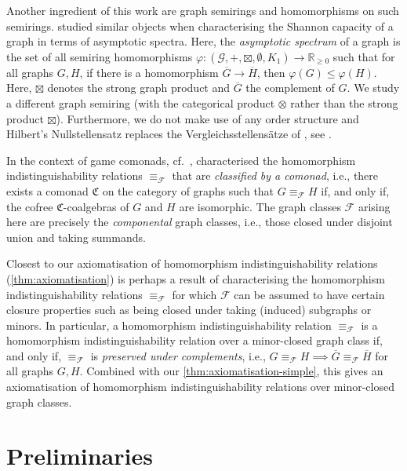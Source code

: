 \documentclass[11pt]{scrartcl}
\theoremstyle{definition}
\theoremstyle{plain}
\theoremstyle{remark}
\renewcommand\phi\varphi
\begin{document}
	Another ingredient of this work are graph semirings and homomorphisms on such semirings.
	\textcite{zuiddam_asymptotic_2019} studied similar objects when characterising the Shannon capacity of a graph in terms of asymptotic spectra.
	Here, the \emph{asymptotic spectrum} of a graph is the set of all semiring homomorphisms $\phi \colon (\mathcal{G}, +, \boxtimes, \emptyset, K_1) \to \mathbb{R}_{\geq 0}$ such that for all graphs $G, H$, if there is a homomorphism $\overline{G} \to \overline{H}$, then $\phi(G) \leq \phi(H)$.
	Here, $\boxtimes$ denotes the strong graph product and $\overline{G}$ the complement of $G$.
	We study a different graph semiring (with the categorical product $\otimes$ rather than the strong product $\boxtimes$). 
	Furthermore, we do not make use of any order structure and Hilbert's Nullstellensatz replaces the Vergleichsstellens\"atze of \textcite{strassen_asymptotic_1988}, see \cite{fritz_unified_2021}.

	In the context of game comonads, cf.\ \cite{dawar_lovasz-type_2021}, \textcite{abramsky_discrete_2022} characterised the homomorphism indistinguishability relations $\equiv_{\mathcal{F}}$ that are \emph{classified by a comonad}, i.e., there exists a comonad $\mathfrak{C}$ on the category of graphs such that $G \equiv_{\mathcal{F}} H$ if, and only if, the cofree $\mathfrak{C}$-coalgebras of $G$ and $H$ are isomorphic.
	The graph classes $\mathcal{F}$ arising here are precisely the \emph{componental} graph classes, i.e., those closed under disjoint union and taking summands. 

	Closest to our axiomatisation of homomorphism indistinguishability relations (\cref{thm:axiomatisation}) is perhaps a result of \textcite{seppelt_logical_2024} characterising the homomorphism indistinguishability relations $\equiv_{\mathcal{F}}$ for which $\mathcal{F}$ can be assumed to have certain closure properties such as being closed under taking (induced) subgraphs or minors.
	In particular, a homomorphism indistinguishability relation $\equiv_{\mathcal{F}}$ is a homomorphism indistinguishability relation over a minor-closed graph class if, and only if, $\equiv_{\mathcal{F}}$ is \emph{preserved under complements}, i.e., $G \equiv_{\mathcal{F}} H \implies \overline G \equiv_{\mathcal{F}} \overline H$ for all graphs $G, H$.
    Combined with our \cref{thm:axiomatisation-simple}, this gives an axiomatisation of homomorphism indistinguishability relations over minor-closed graph classes.


	\section{Preliminaries}
\end{document}
